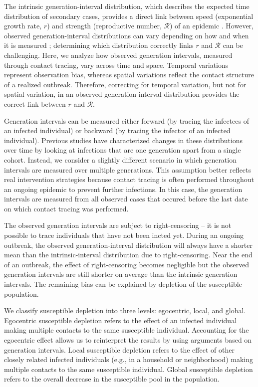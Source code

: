 \documentclass[12pt]{article}
\newcommand{\RR}{\ensuremath{{\mathcal R}}}
\begin{document}
The intrinsic generation-interval distribution, which describes the expected time distribution of secondary cases, provides a direct link between speed (exponential growth rate, $r$) and strength (reproductive number, $\RR$) of an epidemic \citep{wallinga2007generation, svensson2007note, svensson2015influence, park2019practical}.
However, observed generation-interval distributions can vary depending on how and when it is measured \citep{nishiura2010time, tomba2010some, champredon2015intrinsic, britton2019estimation};
determining which distribution correctly links $r$ and $\RR$ can be challenging.
Here, we analyze how observed generation intervals, measured through contact tracing, vary across time and space.
Temporal variations represent observation bias, whereas spatial variations reflect the contact structure of a realized outbreak.
Therefore, correcting for temporal variation, but not for spatial variation, in an observed generation-interval distribution provides the correct link between $r$ and $\RR$.

Generation intervals can be measured either forward (by tracing the infectees of an infected individual) or backward (by tracing the infector of an infected individual).
Previous studies have characterized changes in these distributions over time by looking at infections that are one generation apart from a single cohort.
Instead, we consider a slightly different scenario in which generation intervals are measured over multiple generations.
This assumption better reflects real intervention strategies because contact tracing is often performed throughout an ongoing epidemic to prevent further infections. 
In this case, the generation intervals are measured from all observed cases that occured before the last date on which contact tracing was performed.

The observed generation intervals are subject to right-censoring -- it is not possible to trace individuals that have not been incted yet.
During an ongoing outbreak, the observed generation-interval distribution will always have a shorter mean than the intrinsic-interval distribution due to right-censoring.
Near the end of an outbreak, the effect of right-censoring becomes negligible but the observed generation intervals are still shorter on average than the intrinsic generation intervals.
The remaining bias can be explained by depletion of the susceptible population.

We classify susceptible depletion into three levels: egocentric, local, and global.
Egocentric susceptible depletion refers to the effect of an infected individual making multiple contacts to the same susceptible individual.
Accounting for the egocentric effect allows us to reinterpret the results by \cite{trapman2016inferring} using arguments based on generation intervals.
Local susceptible depletion refers to the effect of other closely related infected individuals (e.g., in a household or neighborhood) making multiple contacts to the same susceptible individual.
Global susceptible depletion refers to the overall decrease in the susceptible pool in the population.
\end{document}
